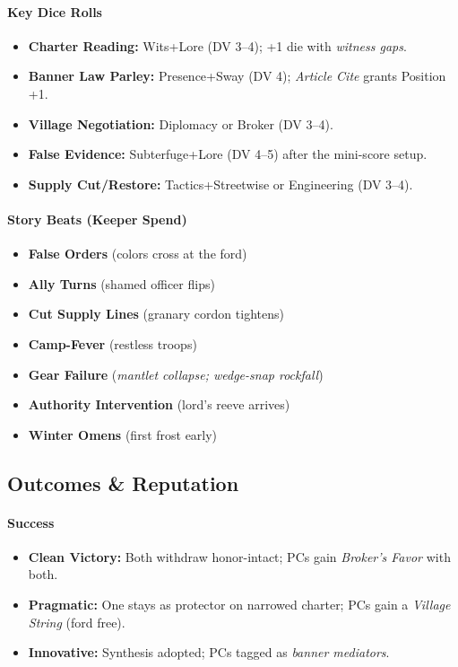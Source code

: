 \documentclass[11pt]{article}
\begin{document}
\paragraph{Key Dice Rolls}
\begin{itemize}[leftmargin=*]
  \item \textbf{Charter Reading:} Wits+Lore (DV 3--4); +1 die with \emph{witness gaps}.
  \item \textbf{Banner Law Parley:} Presence+Sway (DV 4); \textit{Article Cite} grants Position +1.
  \item \textbf{Village Negotiation:} Diplomacy or Broker (DV 3--4).
  \item \textbf{False Evidence:} Subterfuge+Lore (DV 4--5) after the mini-score setup.
  \item \textbf{Supply Cut/Restore:} Tactics+Streetwise or Engineering (DV 3--4).
\end{itemize}

\paragraph{Story Beats (Keeper Spend)}
\begin{itemize}[leftmargin=*]
  \item \textbf{False Orders} (colors cross at the ford)
  \item \textbf{Ally Turns} (shamed officer flips)
  \item \textbf{Cut Supply Lines} (granary cordon tightens)
  \item \textbf{Camp-Fever} (restless troops)
  \item \textbf{Gear Failure} (\emph{mantlet collapse; wedge-snap rockfall})
  \item \textbf{Authority Intervention} (lord's reeve arrives)
  \item \textbf{Winter Omens} (first frost early)
\end{itemize}

\subsection*{Outcomes \& Reputation}
\paragraph{Success}
\begin{itemize}[leftmargin=*]
  \item \textbf{Clean Victory:} Both withdraw honor-intact; PCs gain \emph{Broker's Favor} with both.
  \item \textbf{Pragmatic:} One stays as protector on narrowed charter; PCs gain a \emph{Village String} (ford free).
  \item \textbf{Innovative:} Synthesis adopted; PCs tagged as \emph{banner mediators}.
\end{itemize}
\end{document}
